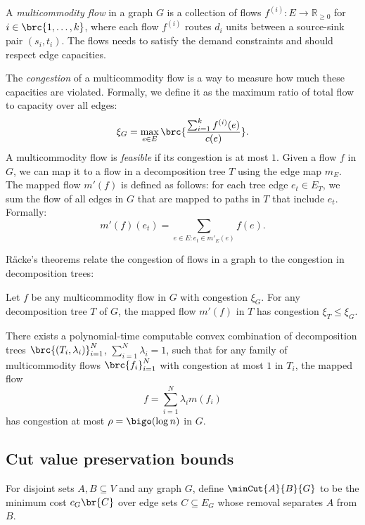 A \emph{multicommodity flow} in a graph $G$ is a collection of flows $f^{(i)}:E\to\mathbb{R}_{\ge 0}$ for $i\in\brc{1,\ldots,k}$, where each flow $f^{(i)}$ routes $d_i$ units between a source-sink pair $(s_i,t_i)$. The flows needs to satisfy the demand constraints and should respect edge capacities.

The \emph{congestion} of a multicommodity flow is a way to measure how much these capacities are violated.
Formally, we define it as the maximum ratio of total flow to capacity over all edges:
\[
  \xi_G = \max_{e\in E} \brc{\frac{\sum_{i=1}^{k} f^{(i)}(e)}{c(e)}}.
\]
A multicommodity flow is \emph{feasible} if its congestion is at most $1$. Given a flow $f$ in $G$, we can map it to a flow in a decomposition tree $T$ using the edge map $m_E$. The mapped flow $m'(f)$ is defined as follows: for each tree edge $e_t\in E_T$, we sum the flow of all edges in $G$ that are mapped to paths in $T$ that include $e_t$. Formally:
\[
  m'(f)(e_t) = \sum_{e\in E: e_t\in m'_E(e)} f(e).
\]

R\"{a}cke's theorems relate the congestion of flows in a graph to the congestion in decomposition trees:

\begin{theorem}\label{thm:flow_mapping}
Let $f$ be any multicommodity flow in $G$ with congestion $\xi_G$.
For any decomposition tree $T$ of $G$, the mapped flow $m'(f)$ in $T$ has congestion $\xi_T\le \xi_G$.
\end{theorem}

\begin{theorem}\label{thm:convex_decomposotion}
There exists a polynomial-time computable convex combination of decomposition
trees $\brc{(T_i,\lambda_i)}_{i=1}^{N}$, $\sum_{i=1}^{N}\lambda_i=1$, such that for any family of multicommodity flows
$\brc{f_i}_{i=1}^{N}$ with congestion at most $1$ in $T_i$, the mapped flow
\[
  f=\sum_{i=1}^{N} \lambda_i m(f_i)
\]
has congestion at most $\rho=\bigo(\log n)$ in $G$.
\end{theorem}

\subsection{Cut value preservation bounds}


For disjoint sets $A,B\subseteq V$ and any graph $G$, define
$\minCut{A}{B}{G}$ to be the minimum cost $c_G\br{C}$ over edge sets $C\subseteq E_G$ whose removal separates $A$ from $B$.

